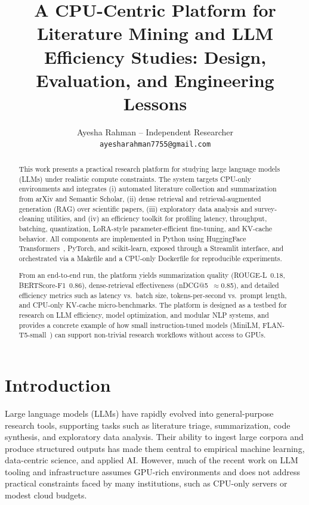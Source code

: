 \documentclass[11pt]{article}
\title{A CPU-Centric Platform for Literature Mining and LLM Efficiency Studies:
Design, Evaluation, and Engineering Lessons}
\author{Ayesha Rahman -- Independent Researcher\\
\texttt{ayesharahman7755@gmail.com}}
\date{}
\begin{document}
\maketitle

\begin{abstract}
This work presents a practical research platform for studying large language models (LLMs) under realistic compute constraints. The system targets CPU-only environments and integrates (i) automated literature collection and summarization from arXiv and Semantic Scholar, (ii) dense retrieval and retrieval-augmented generation (RAG) over scientific papers, (iii) exploratory data analysis and survey-cleaning utilities, and (iv) an efficiency toolkit for profiling latency, throughput, batching, quantization, LoRA-style parameter-efficient fine-tuning, and KV-cache behavior. All components are implemented in Python using HuggingFace Transformers~\citep{wolf2020transformers}, PyTorch, and scikit-learn, exposed through a Streamlit interface, and orchestrated via a Makefile and a CPU-only Dockerfile for reproducible experiments.

From an end-to-end run, the platform yields summarization quality (ROUGE-L~0.18, BERTScore-F1~0.86), dense-retrieval effectiveness (nDCG@5~$\approx$0.85), and detailed efficiency metrics such as latency vs.\ batch size, tokens-per-second vs.\ prompt length, and CPU-only KV-cache micro-benchmarks. The platform is designed as a testbed for research on LLM efficiency, model optimization, and modular NLP systems, and provides a concrete example of how small instruction-tuned models (MiniLM, FLAN-T5-small~\citep{raffel2020t5}) can support non-trivial research workflows without access to GPUs.
\end{abstract}

\section{Introduction}

Large language models (LLMs) have rapidly evolved into general-purpose research tools, supporting tasks such as literature triage, summarization, code synthesis, and exploratory data analysis. Their ability to ingest large corpora and produce structured outputs has made them central to empirical machine learning, data-centric science, and applied AI. However, much of the recent work on LLM tooling and infrastructure assumes GPU-rich environments and does not address practical constraints faced by many institutions, such as CPU-only servers or modest cloud budgets.
\end{document}

